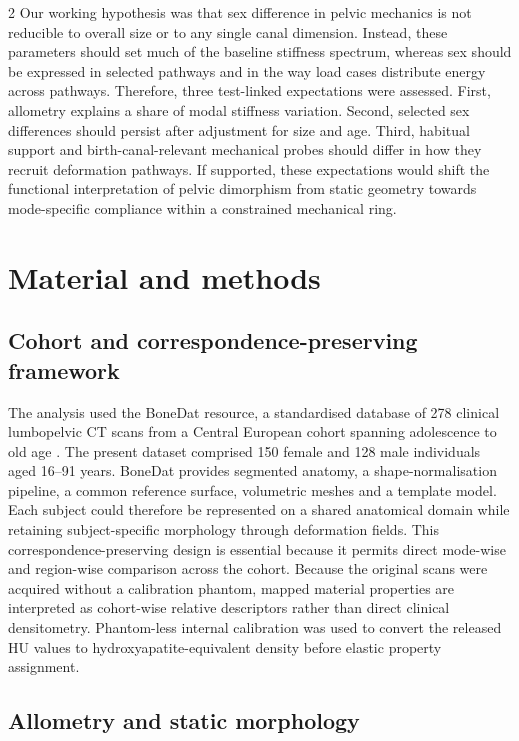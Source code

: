 \documentclass[openacc]{rsproca_new}
\begin{document}
\begin{multicols}{2}
Our working hypothesis was that sex difference in pelvic mechanics is not reducible to overall size or to any single canal dimension. Instead, these parameters should set much of the baseline stiffness spectrum, whereas sex should be expressed in selected pathways and in the way load cases distribute energy across pathways. Therefore, three test-linked expectations were assessed. First, allometry explains a share of modal stiffness variation. Second, selected sex differences should persist after adjustment for size and age. Third, habitual support and birth-canal-relevant mechanical probes should differ in how they recruit deformation pathways. If supported, these expectations would shift the functional interpretation of pelvic dimorphism from static geometry towards mode-specific compliance within a constrained mechanical ring.

\section{Material and methods}

\subsection{Cohort and correspondence-preserving framework}

The analysis used the BoneDat resource, a standardised database of 278 clinical lumbopelvic CT scans from a Central European cohort spanning adolescence to old age \cite{HenysKuchar2025}. The present dataset comprised 150 female and 128 male individuals aged 16--91 years. BoneDat provides segmented anatomy, a shape-normalisation pipeline, a common reference surface, volumetric meshes and a template model. Each subject could therefore be represented on a shared anatomical domain while retaining subject-specific morphology through deformation fields. This correspondence-preserving design is essential because it permits direct mode-wise and region-wise comparison across the cohort. Because the original scans were acquired without a calibration phantom, mapped material properties are interpreted as cohort-wise relative descriptors rather than direct clinical densitometry. Phantom-less internal calibration was used to convert the released HU values to hydroxyapatite-equivalent density before elastic property assignment.

\subsection{Allometry and static morphology}


\end{multicols}
\end{document}
